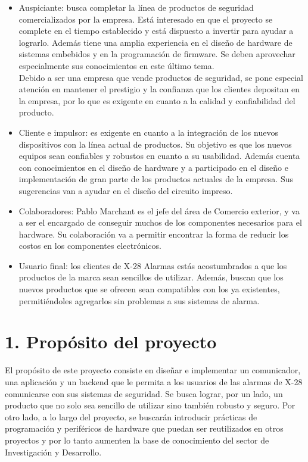 \documentclass[
11pt, %
]{charter}
\begin{document}
\begin{itemize}
	\item Auspiciante: busca completar la línea de productos de seguridad comercializados por la
empresa. Está interesado en que el proyecto se complete en el tiempo establecido y está dispuesto a invertir para ayudar a lograrlo. Además tiene una amplia experiencia en el diseño de hardware de sistemas embebidos y en la programación de firmware. Se deben aprovechar especialmente sus conocimientos en este último tema.\\
Debido a ser una empresa que vende productos de seguridad, se pone especial atención en mantener el prestigio y la confianza que los clientes depositan en la empresa, por lo que es exigente en cuanto a la calidad y confiabilidad del producto.
	\item Cliente e impulsor: es exigente en cuanto a la integración de los nuevos dispositivos con la línea actual de productos. Su objetivo es que los nuevos equipos sean confiables y robustos en cuanto a su usabilidad. Además cuenta con conocimientos en el diseño de hardware y a participado en el diseño e implementación de gran parte de los productos actuales de la empresa. Sus sugerencias van a ayudar en el diseño del circuito impreso.
	\item Colaboradores: Pablo Marchant es el jefe del área de Comercio exterior, y va a ser el encargado de conseguir muchos de los componentes necesarios para el hardware. Su colaboración va a permitir encontrar la forma de reducir los costos en los componentes electrónicos.
	\item Usuario final: los clientes de X-28 Alarmas estás acostumbrados a que los productos de la marca sean sencillos de utilizar. Además, buscan que los nuevos productos que se ofrecen sean compatibles con los ya existentes, permitiéndoles agregarlos sin problemas a sus sistemas de alarma.
\end{itemize}




\section{1. Propósito del proyecto}
\label{sec:proposito}

El propósito de este proyecto consiste en diseñar e implementar un comunicador, una aplicación y un backend que le permita a los usuarios de las alarmas de X-28 comunicarse con sus sistemas de seguridad. Se busca lograr, por un lado, un producto que no solo sea sencillo de utilizar sino también robusto y seguro. Por otro lado, a lo largo del proyecto, se buscarán introducir prácticas de programación y periféricos de hardware que puedan ser reutilizados en otros proyectos  y por lo tanto aumenten la base de conocimiento del sector de Investigación y Desarrollo.
\end{document}
